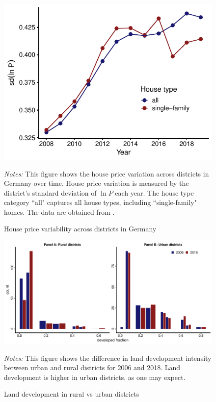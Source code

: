 \documentclass[
  12pt,
]{article}
\begin{document}
\begin{figure}[H]
\centering

\begin{center}\includegraphics{output/figs/price-variation-1} \end{center}

\caption{House price variability across districts in Germany}
\medskip
\begin{minipage}{0.9\textwidth}
\footnotesize
\textit{Notes:} This figure shows the house price variation across districts in Germany over time. House price variation is measured by the district's standard deviation of $\ln P$ each year. The house type category ``all" captures all house types, including ``single-family" homes. The data are obtained from \citet{rwi2020}. 
\end{minipage}
\end{figure}

\begin{figure}[H]
\centering

\begin{center}\includegraphics{output/figs/developed-fraction-histogram-1} \end{center}

\caption{Land development in rural vs urban districts}\label{fig:developed-fraction-histogram}
\medskip
\begin{minipage}{0.9\textwidth}
\footnotesize
\textit{Notes:} This figure shows the difference in land development intensity between urban and rural districts for 2006 and 2018. Land development is higher in urban districts, as one may expect.
\end{minipage}
\end{figure}
\end{document}
